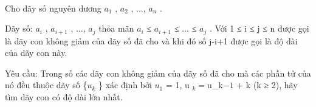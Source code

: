  

Cho dãy số nguyên dương $a_{1}$ , $a_{2}$ , ..., $a_{n}$ .

Dãy số: $a_{i}$ , $a_{i+1}$ , ..., $a_{j}$ thỏa mãn $a_{i}$ ≤ $a_{i+1}$ ≤ ... ≤ $a_{j}$ . Với 1 ≤ i ≤ j ≤ n được gọi là dãy con không giảm của dãy số đã cho và khi đó số j-i+1 được gọi là độ dài của dãy con này.

Yêu cầu: Trong số các dãy con không giảm của dãy số đã cho mà các phần tử của nó đều thuộc dãy số \{$u_{k}$ \} xác định bởi $u_{1}$ = 1, u $_ k = $u_{k}$ -1 $ + k (k ≥ 2), hãy tìm dãy con có độ dài lớn nhất.